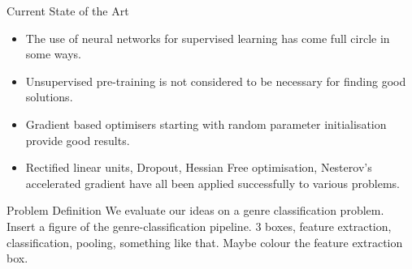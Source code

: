 \documentclass{beamer}
\begin{document}
\begin{frame}{Current State of the Art}
  \begin{itemize}
    \item The use of neural networks for supervised learning has come full circle in some ways.
    \item Unsupervised pre-training is not considered to be necessary for finding good solutions. 
    \item Gradient based optimisers starting with random parameter initialisation provide good results. 
    \item Rectified linear units, Dropout, Hessian Free optimisation, Nesterov's accelerated gradient have all been applied successfully to various problems. 
  \end{itemize}
\end{frame}

\begin{frame}{Problem Definition}
We evaluate our ideas on a genre classification problem. 
Insert a figure of the genre-classification pipeline. 
3 boxes, feature extraction, classification, pooling, something like that. 
Maybe colour the feature extraction box. 
\end{frame}
\end{document}
